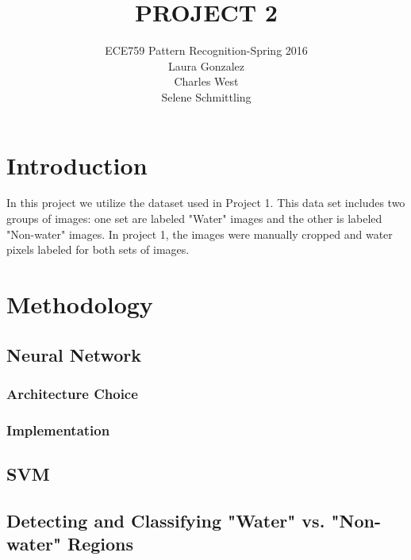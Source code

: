 \documentclass[12pt]{article}
\begin{document}
 
 
\title{PROJECT 2}%
\author{ECE759 Pattern Recognition-Spring 2016\\ %
Laura Gonzalez\\Charles West\\Selene Schmittling\\} %
 
\maketitle

\section{Introduction}

In this project we utilize the dataset used in Project 1.  This data set includes two groups of images: one set are labeled "Water" images and the other is labeled "Non-water" images. In project 1, the images were manually cropped and water pixels labeled for both sets of images. \\


\section{Methodology}
	\subsection{Neural Network}
	\subsubsection{Architecture Choice}
	\subsubsection{Implementation}
	\subsection{SVM}
	\subsection{Detecting and Classifying "Water" vs. "Non-water" Regions}
	
\end{document}
